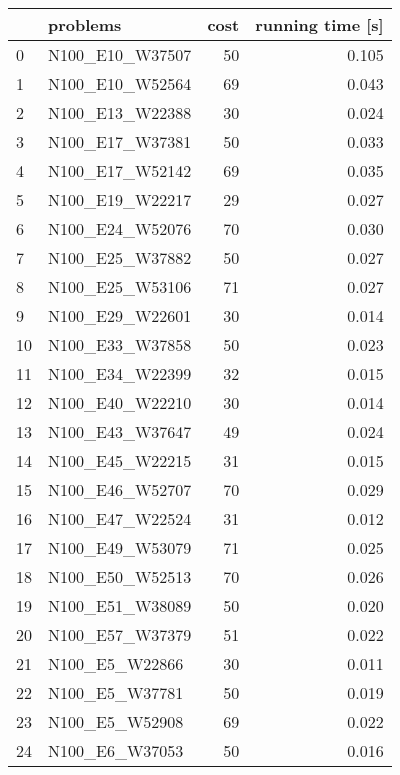 \begin{table}
\centering
\begin{tabular}{llrr}
\toprule
{} &            problems &  cost &  running time [s] \\
\midrule
0  &     N100\_E10\_W37507 &    50 &             0.105 \\
1  &     N100\_E10\_W52564 &    69 &             0.043 \\
2  &     N100\_E13\_W22388 &    30 &             0.024 \\
3  &     N100\_E17\_W37381 &    50 &             0.033 \\
4  &     N100\_E17\_W52142 &    69 &             0.035 \\
5  &     N100\_E19\_W22217 &    29 &             0.027 \\
6  &     N100\_E24\_W52076 &    70 &             0.030 \\
7  &     N100\_E25\_W37882 &    50 &             0.027 \\
8  &     N100\_E25\_W53106 &    71 &             0.027 \\
9  &     N100\_E29\_W22601 &    30 &             0.014 \\
10 &     N100\_E33\_W37858 &    50 &             0.023 \\
11 &     N100\_E34\_W22399 &    32 &             0.015 \\
12 &     N100\_E40\_W22210 &    30 &             0.014 \\
13 &     N100\_E43\_W37647 &    49 &             0.024 \\
14 &     N100\_E45\_W22215 &    31 &             0.015 \\
15 &     N100\_E46\_W52707 &    70 &             0.029 \\
16 &     N100\_E47\_W22524 &    31 &             0.012 \\
17 &     N100\_E49\_W53079 &    71 &             0.025 \\
18 &     N100\_E50\_W52513 &    70 &             0.026 \\
19 &     N100\_E51\_W38089 &    50 &             0.020 \\
20 &     N100\_E57\_W37379 &    51 &             0.022 \\
21 &      N100\_E5\_W22866 &    30 &             0.011 \\
22 &      N100\_E5\_W37781 &    50 &             0.019 \\
23 &      N100\_E5\_W52908 &    69 &             0.022 \\
24 &      N100\_E6\_W37053 &    50 &             0.016 \\

\end{tabular}
\end{table}
